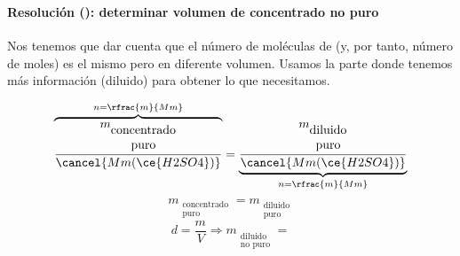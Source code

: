 \begin{frame}
	\frametitle{\ejerciciocmd}
	\framesubtitle{Resolución (): determinar volumen de  concentrado no puro}
	 Nos tenemos que dar cuenta que el número de moléculas de  (y, por tanto, número de moles) es el mismo pero en diferente volumen. Usamos la parte donde tenemos más información (diluido) para obtener lo que necesitamos.\\[.4cm]
	\begin{overprint}
			\begin{center}
			\end{center}
			$$
						\overbrace{\frac{m_{
							\begin{matrix}
								\text{concentrado}\\
								\text{puro}
							\end{matrix}
						}}{\cancel{Mm(\ce{H2SO4})}}}^{n=\rfrac{m}{Mm}} = 
						\underbrace{\frac{m_{
							\begin{matrix}
								\text{diluido}\\
								\text{puro}
							\end{matrix}
						}}{\cancel{Mm(\ce{H2SO4})}}}_{n=\rfrac{m}{Mm}}
			$$
		\onslide<3>
			$$
				m_{
						\begin{matrix}
							\text{concentrado}\\
							\text{puro}
						\end{matrix}
					} = 
				m_{
						\begin{matrix}
							\text{diluido}\\
							\text{puro}
						\end{matrix}
					}
			$$
		\onslide<4>
			$$
				d=\frac{m}{V}\Rightarrow
					m_{
						\begin{matrix}
							\text{diluido}\\
							\text{no puro}
						\end{matrix}
					}
					=
$$
\end{overprint}
\end{frame}
